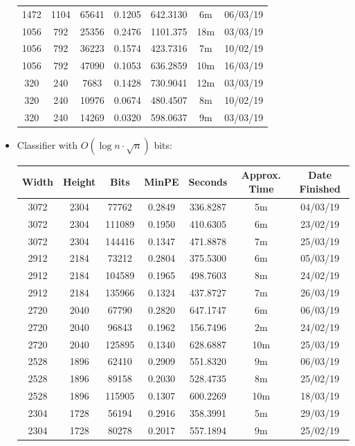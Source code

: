 \documentclass[11pt,a4paper]{report}
\begin{document}
\begin{itemize}
\begin{center}
\begin{tabular}{ c c c | c | c c c }
  1472 & 1104 & 65641 & 0.1205 & 642.3130 & 6m & 06/03/19 \\
  1056 & 792 & 25356 & 0.2476 & 1101.375 & 18m & 03/03/19 \\
  1056 & 792 & 36223 & 0.1574 & 423.7316 & 7m & 10/02/19 \\
  1056 & 792 & 47090 & 0.1053 & 636.2859 & 10m & 16/03/19 \\
  320 & 240 & 7683 & 0.1428 & 730.9041 & 12m & 03/03/19 \\
  320 & 240 & 10976 & 0.0674 & 480.4507 & 8m & 10/02/19 \\
  320 & 240 & 14269 & 0.0320 & 598.0637 & 9m & 03/03/19 \\
  \end{tabular}
  \end{center}

\newpage
\item Classifier with $O(\log{n} \cdot \sqrt{n})$ bits:
  \begin{center}
  \begin{tabular}{ c c c | c | c c c }
  Width & Height & Bits & MinPE & Seconds & Approx. Time & Date Finished \\ \hline
  3072 & 2304 & 77762 & 0.2849 & 336.8287 & 5m & 04/03/19 \\
  3072 & 2304 & 111089 & 0.1950 & 410.6305 & 6m & 23/02/19 \\
  3072 & 2304 & 144416 & 0.1347 & 471.8878 & 7m & 25/03/19 \\
  2912 & 2184 & 73212 & 0.2804 & 375.5300 & 6m & 05/03/19 \\
  2912 & 2184 & 104589 & 0.1965 & 498.7603 & 8m & 24/02/19 \\
  2912 & 2184 & 135966 & 0.1324 & 437.8727 & 7m & 26/03/19 \\
  2720 & 2040 & 67790 & 0.2820 & 647.1747 & 6m & 06/03/19 \\
  2720 & 2040 & 96843 & 0.1962 & 156.7496 & 2m & 24/02/19 \\
  2720 & 2040 & 125895 & 0.1340 & 628.6887 & 10m & 25/03/19 \\
  2528 & 1896 & 62410 & 0.2909 & 551.8320 & 9m & 06/03/19 \\
  2528 & 1896 & 89158 & 0.2030 & 528.4735 & 8m & 25/02/19 \\
  2528 & 1896 & 115905 & 0.1307 & 600.2269 & 10m & 18/03/19 \\
  2304 & 1728 & 56194 & 0.2916 & 358.3991 & 5m & 29/03/19 \\
  2304 & 1728 & 80278 & 0.2017 & 557.1894 & 9m & 25/02/19 \\

\end{tabular}
\end{center}
\end{itemize}
\end{document}
